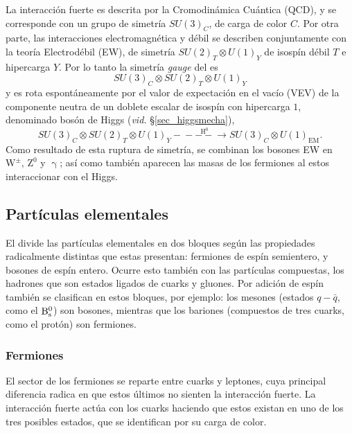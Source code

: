 La interacción fuerte es descrita por la Cromodinámica Cuántica (QCD), y se corresponde con un grupo de simetría $SU(3)_{C}$, de carga de color $C$. Por otra parte, las interacciones electromagnética y débil se describen conjuntamente con la teoría Electrodébil (EW), de simetría $SU(2)_T \otimes U(1)_Y $ de isospín débil $T$ e hipercarga $Y$. Por lo tanto la simetría \emph{gauge} del \stdmod es 
\[SU(3)_{C}\otimes SU(2)_T \otimes U(1)_Y \]
y es rota espontáneamente por el valor de expectación en el vacío (VEV) de la componente neutra de un doblete escalar de isospín con hipercarga $1$, denominado bosón de Higgs (\emph{vid.} \S \ref{sec_higgsmecha}),
\begin{equation}
	SU(3)_{C}\otimes SU(2)_T \otimes U(1)_Y -\!\!\!\!-\!\!\!\overset{\mathrm{H^0}}{-\!\!-}\!\!\!\rightarrow SU(3)_C \otimes U(1)_{\text{EM}}.
\end{equation}
Como resultado de esta ruptura de simetría, se combinan los bosones EW en $\mathrm{W^{\pm},\, Z^{0}}$ y $\upgamma$; así como también aparecen las masas de los fermiones al estos interaccionar con el Higgs.




\subsection{Partículas elementales} %

El \stdmod divide las partículas elementales en dos bloques según las propiedades radicalmente distintas que estas presentan: fermiones de espín semientero, y bosones de espín entero. \color{vero} Ocurre esto también con las partículas compuestas,  los hadrones que son estados ligados de cuarks y gluones. \color{norm} Por adición de espín también se clasifican en estos bloques, por ejemplo: los mesones (estados $q-\bar{q}$, como el $\text{B}{}_{\text{s}}^{\text{0}}$) son bosones, mientras que los bariones (compuestos de tres cuarks, como el protón) son fermiones.


\subsubsection{Fermiones} %

El sector de los fermiones se reparte entre cuarks y leptones, cuya principal diferencia radica en que estos últimos no sienten la interacción fuerte. 
La interacción fuerte \color{vero} actúa \color{norm} con los cuarks haciendo que estos existan en uno de los tres posibles estados, que se identifican por su carga de color.

